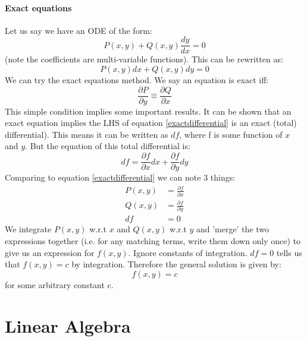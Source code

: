 \documentclass{scrartcl}
\begin{document}
\subsection{Exact equations}
Let us say we have an ODE of the form:
\begin{equation}
P(x, y) + Q(x, y)\frac{dy}{dx} = 0
\end{equation}
(note the coefficients are multi-variable functions). This can be rewritten as:
\begin{equation} \label{exactdifferential}
P(x, y) dx + Q(x, y) dy = 0
\end{equation}
We can try the exact equations method. We say an equation is exact iff:
\begin{equation}
\frac{\partial P}{\partial y} \equiv \frac{\partial Q}{\partial x} 
\end{equation}
This simple condition implies some important results. It can be shown that an exact equation implies the LHS of equation \ref{exactdifferential} is an exact (total) differential). This means it can be written as $ df $, where f is some function of $ x $ and $ y $. But the equation of this total differential is:
\begin{equation}
df = \frac{\partial f}{\partial x}dx + \frac{\partial f}{\partial y}dy
\end{equation}
Comparing to equation \ref{exactdifferential} we can note 3 things:
\begin{equation}
\begin{split}
P(x, y) & = \frac{\partial f}{\partial x} \\
Q(x, y) & = \frac{\partial f}{\partial y} \\
df & = 0
\end{split}
\end{equation}
We integrate $ P(x, y) $ w.r.t $ x $ and $ Q(x, y) $ w.r.t $ y $ and 'merge' the two expressions together (i.e. for any matching terms, write them down only once) to give us an expression for $ f(x, y) $. Ignore constants of integration. $ df = 0 $ tells us that $ f(x, y) = c $ by integration. Therefore the general solution is given by:
\begin{equation}
f(x, y) = c
\end{equation}
for some arbitrary constant c.

\newpage
\part{Linear Algebra}
\end{document}
